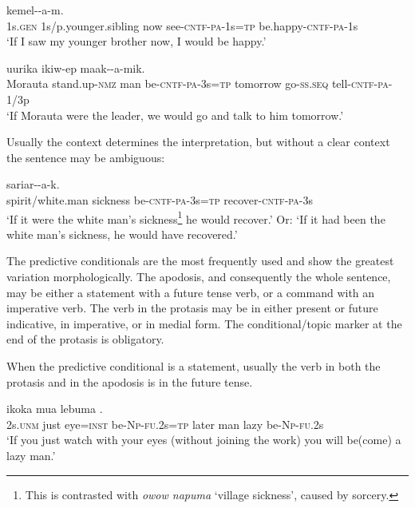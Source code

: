 \ea%
\label{ex:x1646}
\gll [Yena  aamun  aakisa  uruf-\textstyleEmphasizedVernacularWords{ek}-a-m=\textstyleEmphasizedVernacularWords{na}] kemel--a-m.\\
1s.\textsc{gen} 1s/p.younger.sibling  now  see-\textsc{cntf}-\textsc{pa}-1s=\textsc{tp} be.happy-\textsc{cntf}-\textsc{pa}-1s\\
\glt`If I saw my younger brother now, I would be happy.'
\z


\ea%
\label{ex:x1647}
\gll [Morauta  iimar-ow(a)  mua  ik-\textstyleEmphasizedVernacularWords{ek}-a-k=\textstyleEmphasizedVernacularWords{na},] uurika ikiw-ep  maak--a-mik.\\
Morauta  stand.up-\textsc{nmz} man be-\textsc{cntf}-\textsc{pa}-3s=\textsc{tp} tomorrow go-\textsc{ss}.\textsc{seq} tell-\textsc{cntf}-\textsc{pa}-1/3p\\
\glt`If Morauta were the leader, we would go and talk to him tomorrow.'
\z


Usually the context determines the interpretation, but without a clear context the sentence may be ambiguous:  

\ea%
\label{ex:x1648}
\gll [Inasin  napuma  ik-\textstyleEmphasizedVernacularWords{ek}-a-k=\textstyleEmphasizedVernacularWords{na}]  sariar--a-k.\\
spirit/white.man sickness be-\textsc{cntf}-\textsc{pa}-3s=\textsc{tp} recover-\textsc{cntf}-\textsc{pa}-3s\\
\glt`If it were the white man's sickness\footnote{This is contrasted with \textit{owow napuma} `village sickness', caused by sorcery.} he would recover.' Or: `If it had been the white man's sickness, he would have recovered.'
\z


The predictive conditionals are the most frequently used and show the greatest variation morphologically. The apodosis, and consequently the whole sentence, may be either a statement with a future tense verb, or a command with an imperative verb. The verb in the protasis may be in either present or future indicative, in imperative, or in medial form. The conditional/topic marker at the end of the protasis is obligatory. 

When the predictive conditional is a statement, usually the verb in both the protasis and in the apodosis is in the future tense.

\ea%
\label{ex:x1652}
\gll [No  oram  mokok=iw  \textstyleEmphasizedVernacularWords{ika-i-nan=na}]  ikoka  mua  lebuma \textstyleEmphasizedVernacularWords{-}\textstyleEmphasizedVernacularWords{-}.\\
2s.\textsc{unm} just  eye=\textsc{inst} be-\textsc{Np}-\textsc{fu}.2s=\textsc{tp} later  man  lazy be-\textsc{Np}-\textsc{fu}.2s\\
\glt`If you just watch with your eyes (without joining the work) you will be(come) a lazy man.'
\z


